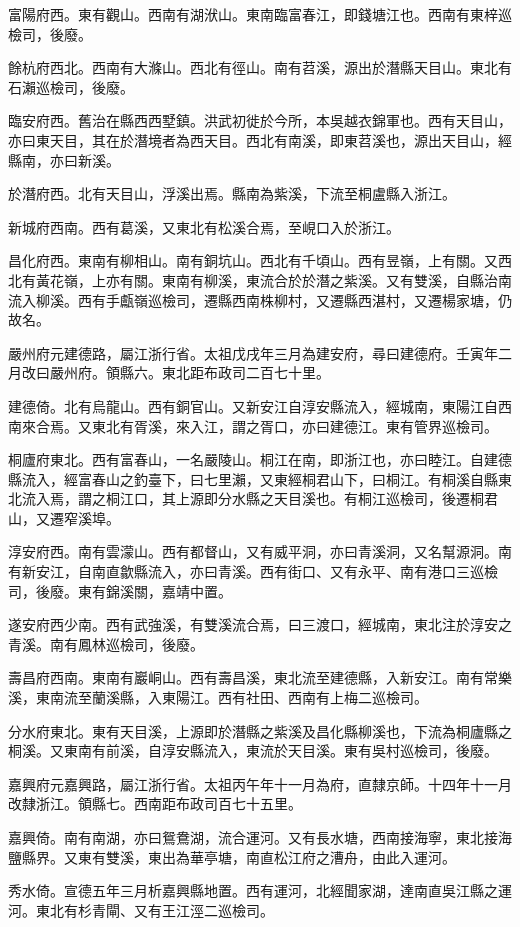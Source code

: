 富陽府西。東有觀山。西南有湖洑山。東南臨富春江，即錢塘江也。西南有東梓巡檢司，後廢。

餘杭府西北。西南有大滌山。西北有徑山。南有苕溪，源出於潛縣天目山。東北有石瀨巡檢司，後廢。

臨安府西。舊治在縣西西墅鎮。洪武初徙於今所，本吳越衣錦軍也。西有天目山，亦曰東天目，其在於潛境者為西天目。西北有南溪，即東苕溪也，源出天目山，經縣南，亦曰新溪。

於潛府西。北有天目山，浮溪出焉。縣南為紫溪，下流至桐盧縣入浙江。

新城府西南。西有葛溪，又東北有松溪合焉，至峴口入於浙江。

昌化府西。東南有柳相山。南有銅坑山。西北有千頃山。西有昱嶺，上有關。又西北有黃花嶺，上亦有關。東南有柳溪，東流合於於潛之紫溪。又有雙溪，自縣治南流入柳溪。西有手甗嶺巡檢司，遷縣西南株柳村，又遷縣西湛村，又遷楊家塘，仍故名。

嚴州府元建德路，屬江浙行省。太祖戊戌年三月為建安府，尋曰建德府。壬寅年二月改曰嚴州府。領縣六。東北距布政司二百七十里。

建德倚。北有烏龍山。西有銅官山。又新安江自淳安縣流入，經城南，東陽江自西南來合焉。又東北有胥溪，來入江，謂之胥口，亦曰建德江。東有管界巡檢司。

桐廬府東北。西有富春山，一名嚴陵山。桐江在南，即浙江也，亦曰睦江。自建德縣流入，經富春山之釣臺下，曰七里瀨，又東經桐君山下，曰桐江。有桐溪自縣東北流入焉，謂之桐江口，其上源即分水縣之天目溪也。有桐江巡檢司，後遷桐君山，又遷窄溪埠。

淳安府西。南有雲濛山。西有都督山，又有威平洞，亦曰青溪洞，又名幫源洞。南有新安江，自南直歙縣流入，亦曰青溪。西有街口、又有永平、南有港口三巡檢司，後廢。東有錦溪關，嘉靖中置。

遂安府西少南。西有武強溪，有雙溪流合焉，曰三渡口，經城南，東北注於淳安之青溪。南有鳳林巡檢司，後廢。

壽昌府西南。東南有巖峒山。西有壽昌溪，東北流至建德縣，入新安江。南有常樂溪，東南流至蘭溪縣，入東陽江。西有社田、西南有上梅二巡檢司。

分水府東北。東有天目溪，上源即於潛縣之紫溪及昌化縣柳溪也，下流為桐廬縣之桐溪。又東南有前溪，自淳安縣流入，東流於天目溪。東有吳村巡檢司，後廢。

嘉興府元嘉興路，屬江浙行省。太祖丙午年十一月為府，直隸京師。十四年十一月改隸浙江。領縣七。西南距布政司百七十五里。

嘉興倚。南有南湖，亦曰鴛鴦湖，流合運河。又有長水塘，西南接海寧，東北接海鹽縣界。又東有雙溪，東出為華亭塘，南直松江府之漕舟，由此入運河。

秀水倚。宣德五年三月析嘉興縣地置。西有運河，北經聞家湖，達南直吳江縣之運河。東北有杉青閘、又有王江涇二巡檢司。

